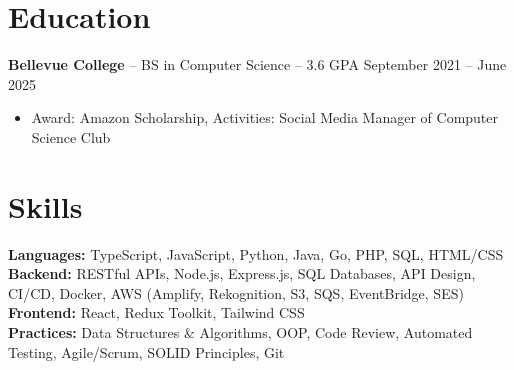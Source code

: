 \documentclass[11pt]{article}
\begin{document}

\vspace{-18.5pt}

\section*{Education}
\textbf{Bellevue College} -- BS in Computer Science -- 3.6 GPA \hfill September 2021 -- June 2025\\
\vspace{-9pt}
\begin{itemize}
  \item Award: Amazon Scholarship, Activities: Social Media Manager of Computer Science Club
\end{itemize}

\vspace{-18.5pt}

\section*{Skills}
\textbf{Languages:} TypeScript, JavaScript, Python, Java, Go, PHP, SQL, HTML/CSS\\
\textbf{Backend:} RESTful APIs, Node.js, Express.js, SQL Databases, API Design, CI/CD, Docker, AWS (Amplify, Rekognition, S3, SQS, EventBridge, SES)\\
\textbf{Frontend:} React, Redux Toolkit, Tailwind CSS\\
\textbf{Practices:} Data Structures \& Algorithms, OOP, Code Review, Automated Testing, Agile/Scrum, SOLID Principles, Git\\\\

\vspace{-6.5pt}
\end{document}
